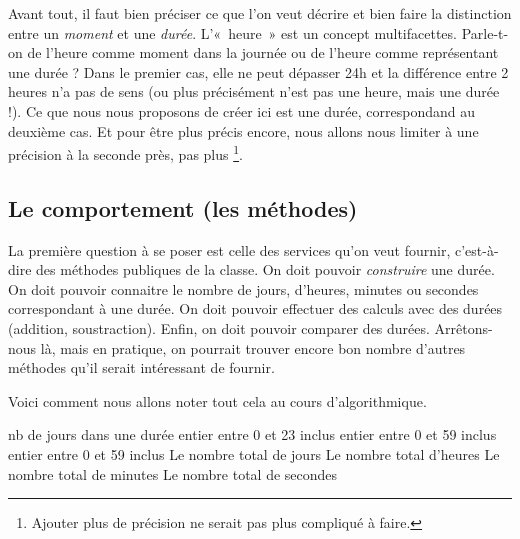 		Avant tout, il faut bien préciser ce que l’on veut décrire
		et bien faire la distinction entre un \emph{moment} et une \emph{durée}.
		L’«~heure~» est un concept multifacettes. 
		Parle-t-on de l’heure comme moment dans la journée 
		ou de l’heure comme représentant une durée ? 
		Dans le premier cas, elle ne peut dépasser 24h 
		et la différence entre 2 heures n’a pas de sens 
		(ou plus précisément n’est pas une heure, mais une durée !).
		Ce que nous nous proposons de créer ici est une durée,
		correspondand au deuxième cas.
		Et pour être plus précis encore,
		nous allons nous limiter à une précision à la seconde près,
		pas plus%
		\footnote{%
			Ajouter plus de précision ne serait pas plus compliqué à faire.%
		}.
	
	\subsection{Le comportement (les méthodes)}
	
		La première question à se poser est celle des services qu’on veut
		fournir, c’est-à-dire des méthodes publiques de la classe. On doit
		pouvoir \textit{construire} une durée. On doit pouvoir connaitre le
		nombre de jours, d’heures, minutes ou secondes correspondant à une durée. On doit
		pouvoir effectuer des calculs avec des durées (addition, soustraction).
		Enfin, on doit pouvoir comparer des durées. Arrêtons-nous là, mais en
		pratique, on pourrait trouver encore bon nombre d’autres méthodes qu’il
		serait intéressant de fournir. 
		
		Voici comment nous allons noter tout cela au cours d'algorithmique.
		
		\begin{LDA}
				\Public
					\Empty
					\RComment nb de jours dans une durée
					\RComment entier entre 0 et 23 inclus
					\RComment entier entre 0 et 59 inclus
					\RComment entier entre 0 et 59 inclus
					\Empty
					\RComment Le nombre total de jours
					\RComment Le nombre total d’heures
					\RComment Le nombre total de minutes
					\RComment Le nombre total de secondes
					\Empty
			\EndClass
		\end{LDA}
		
